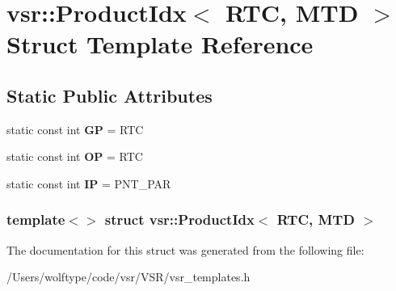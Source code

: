 \hypertarget{structvsr_1_1_product_idx_3_01_r_t_c_00_01_m_t_d_01_4}{\section{vsr\-:\-:Product\-Idx$<$ R\-T\-C, M\-T\-D $>$ Struct Template Reference}
\label{structvsr_1_1_product_idx_3_01_r_t_c_00_01_m_t_d_01_4}
}
\subsection*{Static Public Attributes}
\begin{DoxyCompactItemize}
\item 
\hypertarget{structvsr_1_1_product_idx_3_01_r_t_c_00_01_m_t_d_01_4_a00ffab99bec9e3a5227e8d0c80499e5b}{static const int {\bfseries G\-P} = R\-T\-C}\label{structvsr_1_1_product_idx_3_01_r_t_c_00_01_m_t_d_01_4_a00ffab99bec9e3a5227e8d0c80499e5b}

\item 
\hypertarget{structvsr_1_1_product_idx_3_01_r_t_c_00_01_m_t_d_01_4_a933570270f7e765599ed70cecffb406a}{static const int {\bfseries O\-P} = R\-T\-C}\label{structvsr_1_1_product_idx_3_01_r_t_c_00_01_m_t_d_01_4_a933570270f7e765599ed70cecffb406a}

\item 
\hypertarget{structvsr_1_1_product_idx_3_01_r_t_c_00_01_m_t_d_01_4_a14e35d69769ad8108853ab3490d0d806}{static const int {\bfseries I\-P} = P\-N\-T\-\_\-\-P\-A\-R}\label{structvsr_1_1_product_idx_3_01_r_t_c_00_01_m_t_d_01_4_a14e35d69769ad8108853ab3490d0d806}

\end{DoxyCompactItemize}
\subsubsection*{template$<$$>$ struct vsr\-::\-Product\-Idx$<$ R\-T\-C, M\-T\-D $>$}



The documentation for this struct was generated from the following file\-:\begin{DoxyCompactItemize}
\item 
/\-Users/wolftype/code/vsr/\-V\-S\-R/vsr\-\_\-templates.\-h\end{DoxyCompactItemize}
